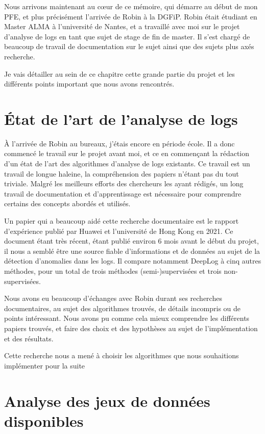 \documentclass[openany, 12pt]{memoir}
\begin{document}
Nous arrivons maintenant au cœur de ce mémoire, qui démarre au début de mon PFE, et plus précisément l'arrivée de Robin à la \gls{DGFiP}. Robin était étudiant en Master ALMA à l'université de Nantes, et a travaillé avec moi sur le projet d'analyse de \glspl{log} en tant que sujet de stage de fin de master. Il s'est chargé de beaucoup de travail de documentation sur le sujet ainsi que des sujets plus axés recherche.

Je vais détailler au sein de ce chapitre cette grande partie du projet et les différents points important que nous avons rencontrés.

\section{État de l'art de l'analyse de logs}

À l'arrivée de Robin au bureaux, j'étais encore en période école. Il a donc commencé le travail sur le projet avant moi, et ce en commençant la rédaction d'un état de l'art des algorithmes d'analyse de \glspl{log} existants. Ce travail est un travail de longue haleine, la compréhension des papiers n'étant pas du tout triviale. Malgré les meilleurs efforts des chercheurs les ayant rédigés, un long travail de documentation et d'apprentissage est nécessaire pour comprendre certains des concepts abordés et utilisés.

Un papier qui a beaucoup aidé cette recherche documentaire est le rapport d'expérience \cite{experiencereport} publié par Huawei et l'université de Hong Kong en 2021. Ce document étant très récent, étant publié environ 6 mois avant le début du projet, il nous a semblé être une source fiable d'informations et de données au sujet de la détection d'anomalies dans les logs. Il compare notamment DeepLog à cinq autres méthodes, pour un total de trois méthodes (semi-)supervisées et trois non-supervisées.

Nous avons eu beaucoup d'échanges avec Robin durant ses recherches documentaires, au sujet des algorithmes trouvés, de détails incompris ou de points intéressant. Nous avons pu comme cela mieux comprendre les différents papiers trouvés, et faire des choix et des hypothèses au sujet de l'implémentation et des résultats.

\bigskip
Cette recherche nous a mené à choisir les algorithmes que nous souhaitions implémenter pour la suite

\section{Analyse des jeux de données disponibles}
\end{document}
